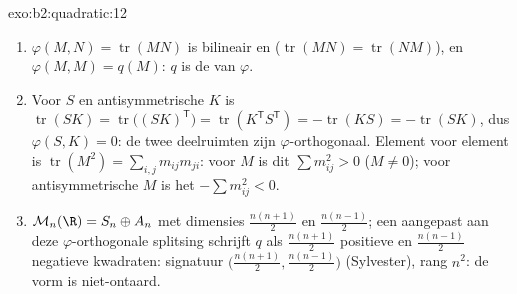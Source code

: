 \begin{solution}{exo:b2:quadratic:12}
\begin{enumerate}
  \item $\varphi(M, N) = \operatorname{tr}(MN)$ is bilineair en
         ($\operatorname{tr}(MN) =
        \operatorname{tr}(NM)$), en $\varphi(M, M) = q(M)$:
        $q$ is de  van $\varphi$.
  \item Voor  $S$ en antisymmetrische $K$ is
        $\operatorname{tr}(SK) =
        \operatorname{tr}\bigl((SK)^{\mathsf T}\bigr) =
        \operatorname{tr}(K^{\mathsf T}S^{\mathsf T}) =
        -\operatorname{tr}(KS) = -\operatorname{tr}(SK)$, dus
        $\varphi(S, K) = 0$: de twee deelruimten zijn
        $\varphi$-orthogonaal. Element voor element is
        $\operatorname{tr}(M^2) = \sum_{i,j} m_{ij}m_{ji}$: voor
         $M$ is dit $\sum m_{ij}^2 > 0$ ($M \neq 0$);
        voor antisymmetrische $M$ is het $-\sum m_{ij}^2 < 0$.
  \item $\mathcal M_n(\R) = S_n \oplus A_n$ met dimensies
        $\frac{n(n+1)}2$ en $\frac{n(n-1)}2$; een 
        aangepast aan deze $\varphi$-orthogonale splitsing
        schrijft $q$ als $\frac{n(n+1)}2$ positieve en
        $\frac{n(n-1)}2$ negatieve kwadraten: signatuur
        $\bigl(\frac{n(n+1)}2, \frac{n(n-1)}2\bigr)$
        (Sylvester), rang $n^2$: de vorm is niet-ontaard.
\end{enumerate}
\end{solution}

